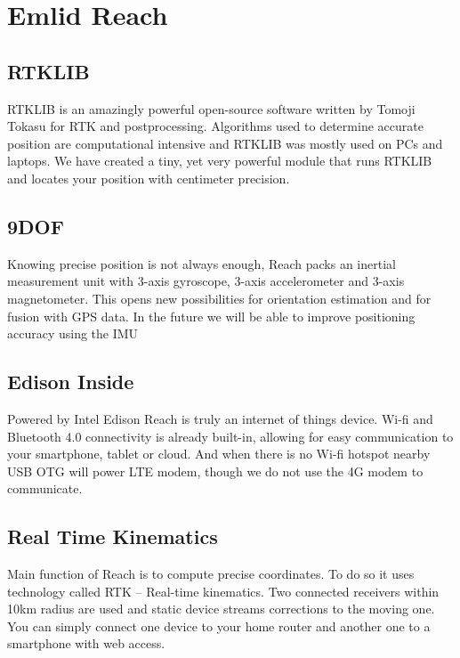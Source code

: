\documentclass[12pt]{report}
\begin{document}
\chapter{Emlid Reach}
\section{RTKLIB}
RTKLIB is an amazingly powerful open-source software written by Tomoji Tokasu for RTK and postprocessing. Algorithms used to determine accurate position are computational intensive and RTKLIB was mostly used on PCs and laptops. We have created a tiny, yet very powerful module that runs RTKLIB and locates your position with centimeter precision.

\section{9DOF}
Knowing precise position is not always enough, Reach packs an inertial measurement unit with 3-axis gyroscope, 3-axis accelerometer and 3-axis magnetometer. This opens new possibilities for orientation estimation and for fusion with GPS data. In the future we will be able to improve positioning accuracy using the IMU

\section{Edison Inside}
Powered by Intel Edison Reach is truly an internet of things device. Wi-fi and Bluetooth 4.0 connectivity is already built-in, allowing for easy communication to your smartphone, tablet or cloud. And when there is no Wi-fi hotspot nearby USB OTG will power LTE modem, though we do not use the 4G modem to communicate.

\section{Real Time Kinematics}
Main function of Reach is to compute precise coordinates. To do so it uses technology called RTK – Real-time kinematics. Two connected receivers within 10km radius are used and static device streams corrections to the moving one. You can simply connect one device to your home router and another one to a smartphone with web access.
\end{document}
